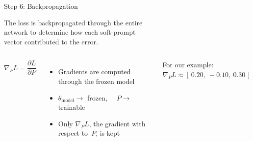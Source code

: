 \documentclass[aspectratio=169,10pt]{beamer}
\begin{document}
\begin{frame}{Step 6: Backpropagation}
  \small
  {\raggedright The loss is backpropagated through the entire \\network to determine how each soft-prompt \\vector contributed to the error.\par}
  \vskip0.25cm
  \begin{columns}[T]
      \small
      \hspace{0.3cm}\(\nabla_P L = \dfrac{\partial L}{\partial P}\)
      \vskip0.25cm
      \begin{itemize}\itemsep5pt
        \item \footnotesize Gradients are computed through the frozen model
        \item \footnotesize $\theta_{\text{model}} \to$ frozen, $\quad P \to$ trainable
        \item \footnotesize Only $\nabla_P L$, the gradient with respect to\ $P$, is kept
      \end{itemize}
      \vskip0.2cm
      \footnotesize For our example: $\nabla_P L \approx [\,0.20,\ -0.10,\ 0.30\,]$
      \centering
      \vspace{-1.1cm}%
      \resizebox{0.62\linewidth}{!}{\ptwexbackprop}
  \end{columns}
\end{frame}
\end{document}
